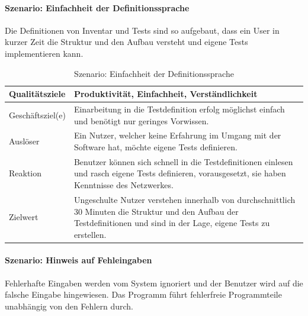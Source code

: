 \documentclass[]{subfiles}
\begin{document}
		\paragraph{Szenario: Einfachheit der Definitionssprache}
			Die Definitionen von Inventar und Tests sind so aufgebaut, dass ein User in kurzer Zeit die Struktur und den Aufbau versteht und eigene Tests implementieren kann.
			
			\begin{table}[!h]
				\begin{tabularx}{\textwidth}{lX}
					\toprule
					Qualitätsziele & Produktivität, Einfachheit, Verständlichkeit \\
					\midrule
					Geschäftsziel(e) & Einarbeitung in die Testdefinition erfolg möglichst einfach und benötigt nur geringes Vorwissen.  \\
					\midrule
					Auslöser & Ein Nutzer, welcher keine Erfahrung im Umgang mit der Software hat, möchte eigene Tests definieren.  \\
					\midrule
					Reaktion & Benutzer können sich schnell in die Testdefinitionen einlesen und rasch eigene Tests definieren, vorausgesetzt, sie haben Kenntnisse des Netzwerkes.  \\
					\midrule
					Zielwert & Ungeschulte Nutzer verstehen innerhalb von durchschnittlich 30 Minuten die Struktur und den Aufbau der Testdefinitionen und sind in der Lage, eigene Tests zu erstellen.  \\
					\bottomrule
				\end{tabularx}
				\caption{Szenario: Einfachheit der Definitionssprache}
			\end{table}
			\newpage
			
		\paragraph{Szenario: Hinweis auf Fehleingaben}
		Fehlerhafte Eingaben werden vom System ignoriert und der Benutzer wird auf die falsche Eingabe hingewiesen. Das Programm führt fehlerfreie Programmteile unabhängig von den Fehlern durch.
		
\end{document}
